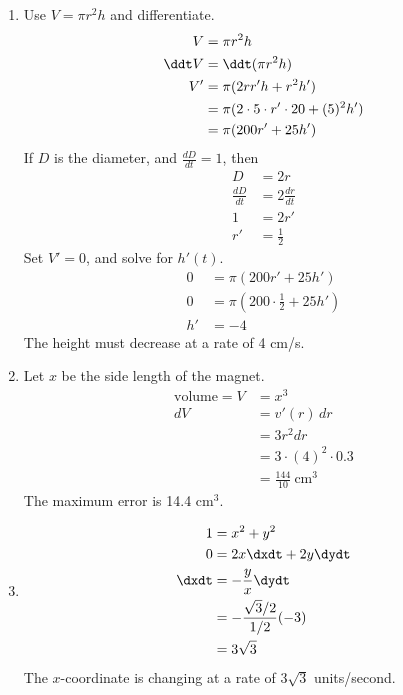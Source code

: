 \begin{enumerate}
   \item Use $V = \pi r^2 h$ and differentiate.
   \begin{align*}
   	V &= \pi r^2 h \\
    \ddt V &= \ddt (\pi r^2 h )\\
    V' 
    &= \pi (2rr'h + r^2h')  \\
    &= \pi (2\cdot 5 \cdot r' \cdot 20 + (5)^2h') \\
    &= \pi (200 r'  + 25h') \\
   \end{align*}
   If $D$ is the diameter, and $\frac{dD}{dt} = 1$, then 
   \begin{align*}
   		D&= 2r \\
        \frac{dD}{dt} &= 2 \frac{dr}{dt} \\
        1 &=2 r' \\
        r' &= \frac 1 2
   \end{align*}
   Set $V' = 0$, and solve for $h'(t)$. 
   \begin{align*}
    	0 &= \pi (200 r'  + 25h') \\
    	0 &= \pi (200 \cdot \frac 1 2  + 25h') \\
        h' &= -4
   \end{align*}   
   The height must decrease at a rate of 4 cm/s. 
   
   \item Let $x$ be the side length of the magnet. 
   \begin{align*}
   	\text{volume} = V &= x^3 \\
    dV &= v'(r) \, dr \\
    &= 3r^2 dr \\
    &= 3 \cdot (4)^2 \cdot 0.3 \\
    &= \frac{144}{10} \ \text{cm}^3
   \end{align*}
   The maximum error is 14.4 cm$^3$.
   
   \item 
   \begin{align*}
   		1 &= x^2 + y^2 \\
        0 &= 2x\dxdt + 2y\dydt \\
        \dxdt &= -\frac y x \dydt \\
        &= -\frac{\sqrt 3 /2 }{1/2} (-3) \\
        &=  3\sqrt 3
   \end{align*}
   The $x$-coordinate is changing at a rate of $3\sqrt 3$ units/second.
\end{enumerate}

















